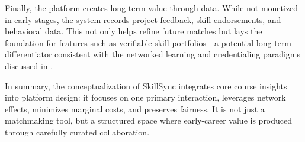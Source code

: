 Finally, the platform creates long-term value through data. While not monetized in early stages, the system records project feedback, skill endorsements, and behavioral data. This not only helps refine future matches but lays the foundation for features such as verifiable skill portfolios---a potential long-term differentiator consistent with the networked learning and credentialing paradigms discussed in \citet{Zuboff2019}.

In summary, the conceptualization of SkillSync integrates core course insights into platform design: it focuses on one primary interaction, leverages network effects, minimizes marginal costs, and preserves fairness. It is not just a matchmaking tool, but a structured space where early-career value is produced through carefully curated collaboration.
